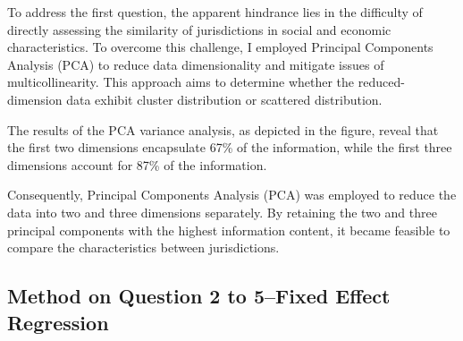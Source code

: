 
To address the first question, the apparent hindrance lies in the difficulty of directly assessing the similarity of jurisdictions in social and economic characteristics. To overcome this challenge, I employed Principal Components Analysis (PCA) to reduce data dimensionality and mitigate issues of multicollinearity. This approach aims to determine whether the reduced-dimension data exhibit cluster distribution or scattered distribution.

The results of the PCA variance analysis, as depicted in the figure, reveal that the first two dimensions encapsulate 67\% of the information, while the first three dimensions account for 87\% of the information.

Consequently, Principal Components Analysis (PCA) was employed to reduce the data into two and three dimensions separately. By retaining the two and three principal components with the highest information content, it became feasible to compare the characteristics between jurisdictions.

\subsection{Method on Question 2 to 5--Fixed Effect Regression}
